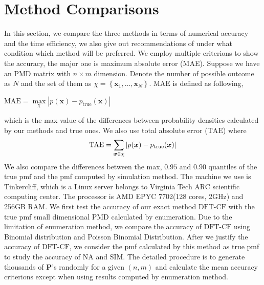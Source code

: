 \documentclass[12pt]{article}
\newcommand{\Pmat}{\mathbf{P}}
\newcommand{\TAE}{{\textrm{TAE}}}
\newcommand{\MAE}{{\textrm{MAE}}}
\newcommand{\PMD}{\textrm{PMD}}
\newcommand{\xvec}{\boldsymbol{x}}
\newcommand{\SIM}{{\textrm{SIM}}}
\newcommand{\NA}{{\textrm{NA}}}
\newcommand{\dft}{{\textrm{DFT-CF}}}
\begin{document}
\section{Method Comparisons}\label{sec:Method Comparisons}
In this section, we compare the three methods in terms of numerical accuracy and the time efficiency, we also give out recommendations of under what condition which method will be preferred. We employ multiple criterions to show the accuracy, the major one is maximum absolute error (MAE). Suppose we have an PMD matrix with $n\times m$ dimension. Denote the number of possible outcome as $N$ and the set of them as $\chi = \left\{\xvec_1,\dots, \xvec_{N}\right\}$. $\MAE$ is defined as following,
\begin{center}
$\mathrm{\MAE} = \underset{\chi}{\max}|p(\xvec) - p_{\text{true}}(\xvec)|$
\end{center}
which is the max value of the differences between probability densities calculated by our methods and true ones.
We also use total absolute error ($\TAE$)  where
\begin{equation*}
    \mbox{\TAE} = \sum_{\xvec \in \chi} |p(\xvec) - p_{\text{true}}(\xvec)|
\end{equation*}
We also compare the differences between the max, $0.95$ and $0.90$ quantiles of the true pmf and the pmf computed by simulation method. The machine we use is Tinkercliff, which is a Linux server belongs to Virginia Tech ARC scientific computing center. The processor is AMD EPYC 7702(128 cores, 2GHz) and 256GB RAM. We first test the accuracy of our exact method $\dft$ with the true pmf small dimensional $\PMD$ calculated by enumeration. Due to the limitation of enumeration method, we compare the accuracy of $\dft$ using Binomial distribution and Poisson Binomial Distribution.
After we justify the accuracy of $\dft$, we consider the pmf calculated by this method as true pmf to study the accuracy of $\NA$ and $\SIM$. The detailed procedure is to generate thousands of $\Pmat$'s randomly for a given $(n, m)$ and calculate the mean accuracy criterions except when using results computed by enumeration method.






\end{document}
